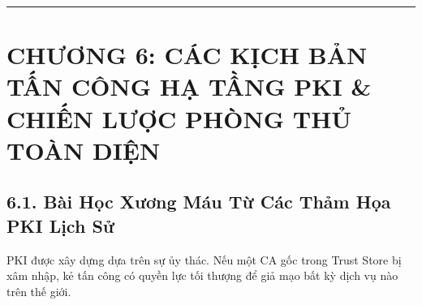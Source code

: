 \documentclass[
]{article}
\begin{document}
\begin{center}\rule{0.5\linewidth}{0.5pt}\end{center}

\section{CHƯƠNG 6: CÁC KỊCH BẢN TẤN CÔNG HẠ TẦNG PKI \& CHIẾN LƯỢC PHÒNG
THỦ TOÀN
DIỆN}\label{chux1b0ux1a1ng-6-cuxe1c-kux1ecbch-bux1ea3n-tux1ea5n-cuxf4ng-hux1ea1-tux1ea7ng-pki-chiux1ebfn-lux1b0ux1ee3c-phuxf2ng-thux1ee7-touxe0n-diux1ec7n}

\subsection{6.1. Bài Học Xương Máu Từ Các Thảm Họa PKI Lịch
Sử}\label{buxe0i-hux1ecdc-xux1b0ux1a1ng-muxe1u-tux1eeb-cuxe1c-thux1ea3m-hux1ecda-pki-lux1ecbch-sux1eed}

PKI được xây dựng dựa trên sự ủy thác. Nếu một CA gốc trong Trust Store
bị xâm nhập, kẻ tấn công có quyền lực tối thượng để giả mạo bất kỳ dịch
vụ nào trên thế giới.
\end{document}
